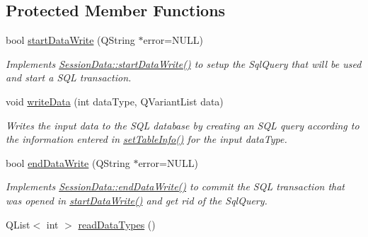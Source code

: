 \subsection*{Protected Member Functions}
\begin{DoxyCompactItemize}
\item 
bool \hyperlink{class_stored_session_data_a9ff975024ea9a09048a8e7e14129b357}{start\-Data\-Write} (Q\-String $\ast$error=N\-U\-L\-L)
\begin{DoxyCompactList}\small\item\em Implements \hyperlink{class_session_data_ab41387e7d78a4261524a201c78d1bb97}{Session\-Data\-::start\-Data\-Write()} to setup the Sql\-Query that will be used and start a S\-Q\-L transaction. \end{DoxyCompactList}\item 
void \hyperlink{class_stored_session_data_aa9d7f702ecdb5b2c3277f29f552329e3}{write\-Data} (int data\-Type, Q\-Variant\-List data)
\begin{DoxyCompactList}\small\item\em Writes the input data to the S\-Q\-L database by creating an S\-Q\-L query according to the information entered in \hyperlink{class_stored_session_data_a4e05e7d7c7bcffe7d0ab20baac3ff115}{set\-Table\-Info()} for the input data\-Type. \end{DoxyCompactList}\item 
bool \hyperlink{class_stored_session_data_a9b226228a31f0721eb58a593f6293aa2}{end\-Data\-Write} (Q\-String $\ast$error=N\-U\-L\-L)
\begin{DoxyCompactList}\small\item\em Implements \hyperlink{class_session_data_aae9d3e70ed86c81f56f5c063d1a2ff2f}{Session\-Data\-::end\-Data\-Write()} to commit the S\-Q\-L transaction that was opened in \hyperlink{class_stored_session_data_a9ff975024ea9a09048a8e7e14129b357}{start\-Data\-Write()} and get rid of the Sql\-Query. \end{DoxyCompactList}\item 
\hypertarget{class_stored_session_data_a621a4d2c9f1b39ac70bc3f2012538465}{Q\-List$<$ int $>$ \hyperlink{class_stored_session_data_a621a4d2c9f1b39ac70bc3f2012538465}{read\-Data\-Types} ()}\label{class_stored_session_data_a621a4d2c9f1b39ac70bc3f2012538465}


\end{DoxyCompactItemize}
